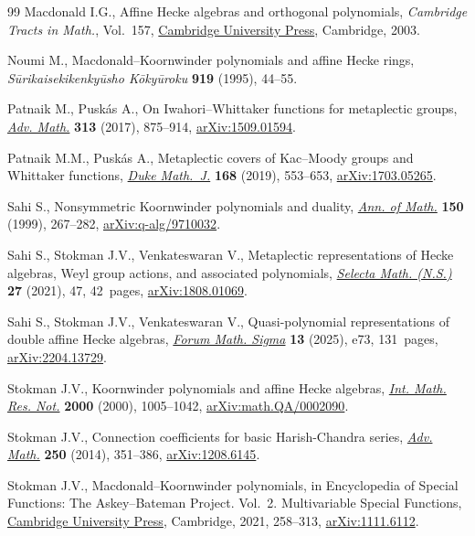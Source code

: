 \documentclass[pdftex]{sigma}
\numberwithin{equation}{section}
\begin{document}
\begin{thebibliography}{99}
Macdonald I.G., Affine {H}ecke algebras and orthogonal polynomials,
 \textit{Cambridge Tracts in Math.}, Vol.~157,
 \href{https://doi.org/10.1017/CBO9780511542824}{Cambridge University Press},
 Cambridge, 2003.

Noumi M., Macdonald--{K}oornwinder polynomials and affine {H}ecke rings,
 \textit{S\=urikaisekikenky\=usho K\={o}ky\=uroku} \textbf{919} (1995),
 44--55.

Patnaik M., Pusk\'as A., On {I}wahori--{W}hittaker functions for metaplectic
 groups, \href{https://doi.org/10.1016/j.aim.2017.04.005}{\textit{Adv. Math.}}
 \textbf{313} (2017), 875--914,
 \href{http://arxiv.org/abs/1509.01594}{arXiv:1509.01594}.

Patnaik M.M., Pusk\'as A., Metaplectic covers of {K}ac--{M}oody groups and
 {W}hittaker functions,
 \href{https://doi.org/10.1215/00127094-2018-0049}{\textit{Duke Math.~J.}}
 \textbf{168} (2019), 553--653,
 \href{http://arxiv.org/abs/1703.05265}{arXiv:1703.05265}.

Sahi S., Nonsymmetric {K}oornwinder polynomials and duality,
 \href{https://doi.org/10.2307/121102}{\textit{Ann. of Math.}} \textbf{150}
 (1999), 267--282,
 \href{http://arxiv.org/abs/q-alg/9710032}{arXiv:q-alg/9710032}.

Sahi S., Stokman J.V., Venkateswaran V., Metaplectic representations of {H}ecke
 algebras, {W}eyl group actions, and associated polynomials,
 \href{https://doi.org/10.1007/s00029-021-00654-1}{\textit{Selecta Math.
 (N.S.)}} \textbf{27} (2021), 47, 42~pages,
 \href{http://arxiv.org/abs/1808.01069}{arXiv:1808.01069}.

Sahi S., Stokman J.V., Venkateswaran V., Quasi-polynomial representations of
 double affine {H}ecke algebras,
 \href{https://doi.org/10.1017/fms.2025.33}{\textit{Forum Math. Sigma}}
 \textbf{13} (2025), e73, 131~pages,
 \href{http://arxiv.org/abs/2204.13729}{arXiv:2204.13729}.


Stokman J.V., Koornwinder polynomials and affine {H}ecke algebras,
 \href{https://doi.org/10.1155/S1073792800000520}{\textit{Int. Math. Res.
 Not.}} \textbf{2000} (2000), 1005--1042,
 \href{http://arxiv.org/abs/math.QA/0002090}{arXiv:math.QA/0002090}.

Stokman J.V., Connection coefficients for basic {H}arish-{C}handra series,
 \href{https://doi.org/10.1016/j.aim.2013.09.016}{\textit{Adv. Math.}}
 \textbf{250} (2014), 351--386,
 \href{http://arxiv.org/abs/1208.6145}{arXiv:1208.6145}.

Stokman J.V., Macdonald--{K}oornwinder polynomials, in Encyclopedia of Special
 Functions: {T}he {A}skey--{B}ateman Project. {V}ol.~2. {M}ultivariable
 Special Functions, \href{https://doi.org/10.1017/9780511777165.010}{Cambridge
 University Press}, Cambridge, 2021, 258--313,
 \href{http://arxiv.org/abs/1111.6112}{arXiv:1111.6112}.

\end{thebibliography}\LastPageEnding
\end{document}
